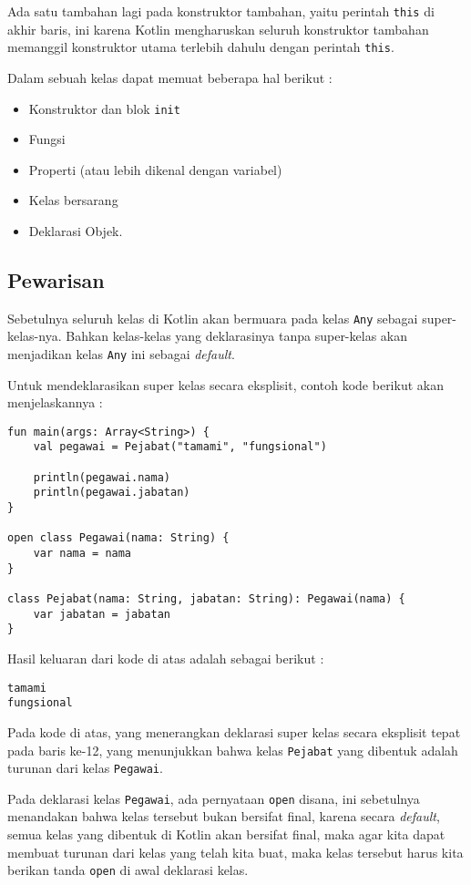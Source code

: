 Ada satu tambahan lagi pada konstruktor tambahan, yaitu perintah \texttt{this} di akhir baris, ini karena Kotlin mengharuskan seluruh konstruktor tambahan memanggil konstruktor utama terlebih dahulu dengan perintah \texttt{this}.

Dalam sebuah kelas dapat memuat beberapa hal berikut :

\begin{itemize}
	\item Konstruktor dan blok \texttt{init}
	\item Fungsi
	\item Properti (atau lebih dikenal dengan variabel)
	\item Kelas bersarang
	\item Deklarasi Objek.
\end{itemize}

\subsection{Pewarisan}

Sebetulnya seluruh kelas di Kotlin akan bermuara pada kelas \texttt{Any} sebagai super-kelas-nya. Bahkan kelas-kelas yang deklarasinya tanpa super-kelas akan menjadikan kelas \texttt{Any} ini sebagai \textit{default}.

Untuk mendeklarasikan super kelas secara eksplisit, contoh kode berikut akan menjelaskannya :

\begin{lstlisting}
fun main(args: Array<String>) {
	val pegawai = Pejabat("tamami", "fungsional")
	
	println(pegawai.nama)
	println(pegawai.jabatan)
}

open class Pegawai(nama: String) {
	var nama = nama
}

class Pejabat(nama: String, jabatan: String): Pegawai(nama) {
	var jabatan = jabatan
}
\end{lstlisting}

Hasil keluaran dari kode di atas adalah sebagai berikut :

\begin{lstlisting}
tamami
fungsional
\end{lstlisting}

Pada kode di atas, yang menerangkan deklarasi super kelas secara eksplisit tepat pada baris ke-12, yang menunjukkan bahwa kelas \texttt{Pejabat} yang dibentuk adalah turunan dari kelas \texttt{Pegawai}.

Pada deklarasi kelas \texttt{Pegawai}, ada pernyataan \texttt{open} disana, ini sebetulnya menandakan bahwa kelas tersebut bukan bersifat final, karena secara \textit{default}, semua kelas yang dibentuk di Kotlin akan bersifat final, maka agar kita dapat membuat turunan dari kelas yang telah kita buat, maka kelas tersebut harus kita berikan tanda \texttt{open} di awal deklarasi kelas.

